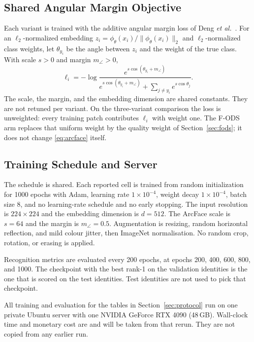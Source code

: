 \subsection{Shared Angular Margin Objective}
\label{sec:arcface}

Each variant is trained with the additive angular margin loss of Deng \emph{et al.}~\cite{deng2019arcface}. For an $\ell_2$-normalized embedding $z_{i}=\phi_{\theta}(x_{i})/\lVert\phi_{\theta}(x_{i})\rVert_{2}$ and $\ell_2$-normalized class weights, let $\theta_{y_{i}}$ be the angle between $z_{i}$ and the weight of the true class. With scale $s>0$ and margin $m_{\angle}>0$,
\begin{equation}
    \ell_{i}
    =
    -\log
    \frac{
        e^{s\cos(\theta_{y_{i}}+m_{\angle})}
    }{
        e^{s\cos(\theta_{y_{i}}+m_{\angle})}
        +
        \sum_{j\neq y_{i}} e^{s\cos\theta_{j}}
    }.
    \label{eq:arcface}
\end{equation}
The scale, the margin, and the embedding dimension are shared constants. They are not retuned per variant. On the three-variant comparison the loss is unweighted: every training patch contributes $\ell_{i}$ with weight one. The F-ODS arm replaces that uniform weight by the quality weight of Section~\ref{sec:fods}; it does not change \eqref{eq:arcface} itself.

\subsection{Training Schedule and Server}
\label{sec:training}

The schedule is shared. Each reported cell is trained from random initialization for 1000 epochs with Adam, learning rate $1\times 10^{-4}$, weight decay $1\times 10^{-4}$, batch size 8, and no learning-rate schedule and no early stopping. The input resolution is $224\times 224$ and the embedding dimension is $d=512$. The ArcFace scale is $s=64$ and the margin is $m_{\angle}=0.5$. Augmentation is resizing, random horizontal reflection, and mild colour jitter, then ImageNet normalisation. No random crop, rotation, or erasing is applied.

Recognition metrics are evaluated every 200 epochs, at epochs 200, 400, 600, 800, and 1000. The checkpoint with the best rank-1 on the validation identities is the one that is scored on the test identities. Test identities are not used to pick that checkpoint.

All training and evaluation for the tables in Section~\ref{sec:protocol} run on one private Ubuntu server with one NVIDIA GeForce RTX 4090 (48\,GB). Wall-clock time and monetary cost are \pending{} and will be taken from that rerun. They are not copied from any earlier run.

